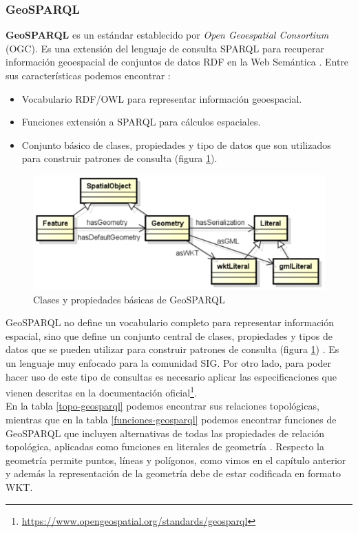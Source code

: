 \subsubsection{GeoSPARQL}

\textbf{GeoSPARQL} es un estándar establecido por \textit{Open Geoespatial Consortium} (OGC). Es una extensión del lenguaje de consulta SPARQL para recuperar información geoespacial de conjuntos de datos RDF en la Web Semántica \cite{libro-gis}. Entre sus características podemos encontrar \cite{ogc-geo}: 

\begin{itemize}
	\item Vocabulario RDF/OWL para representar información geoespacial.
	\item Funciones extensión a SPARQL para cálculos espaciales.
	\item Conjunto básico de clases, propiedades y tipo de datos que son utilizados para construir patrones de consulta (figura \ref{fig:geosparql}). 
\end{itemize}

\begin{figure}[H]
	\centering
	\includegraphics[width=0.83\linewidth]{imagenes/capitulo3/geosparql}
	\caption{Clases y propiedades básicas de GeoSPARQL}
	\label{fig:geosparql}
\end{figure}

GeoSPARQL no define un vocabulario completo para representar información espacial, sino que define un conjunto central de clases, propiedades y tipos de datos que se pueden utilizar para construir patrones de consulta (figura \ref{fig:geosparql}) \cite{ogc-geo}. Es un lenguaje muy enfocado para la comunidad SIG. Por otro lado, para poder hacer uso de este tipo de consultas es necesario aplicar las especificaciones que vienen descritas en la documentación oficial\footnote{\url{https://www.opengeospatial.org/standards/geosparql}}. \\

En la tabla \ref{topo-geosparql} podemos encontrar sus relaciones topológicas, mientras que en la tabla \ref{funciones-geosparql} podemos encontrar funciones de GeoSPARQL que incluyen alternativas de todas las propiedades de relación topológica, aplicadas como funciones en literales de geometría \cite{tesis-otro}. Respecto la geometría permite puntos, líneas y polígonos, como vimos en el capítulo anterior y además la representación de la geometría debe de estar codificada en formato WKT.

